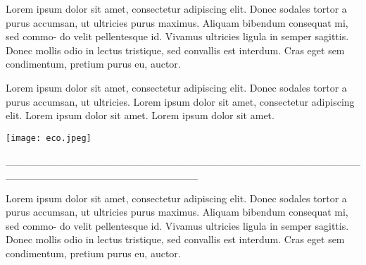 \noindent{}Lorem ipsum dolor sit amet, consectetur adipiscing elit.
Donec sodales tortor a purus accumsan, ut ultricies purus
maximus. Aliquam bibendum consequat mi, sed commo-
do velit pellentesque id. Vivamus ultricies ligula in semper
sagittis. Donec mollis odio in lectus tristique, sed convallis
est interdum. Cras eget sem condimentum, pretium purus
eu, auctor.

\hspace{.5cm}

\hspace*{-.4cm}\begin{minipage}[c]{0.45\linewidth}
\small{
{}}
\end{minipage}
\begin{minipage}[c]{0.50\linewidth}
\small{Lorem ipsum dolor sit amet, consectetur adipiscing elit.
Donec sodales tortor a purus accumsan, ut ultricies. Lorem ipsum dolor sit amet, consectetur adipiscing elit. Lorem ipsum dolor sit amet. Lorem ipsum dolor sit amet.} 
\end{minipage}

\pagebreak

\hspace{.5cm}

\begin{center}
\hspace*{-.5cm}\texttt{[image: eco.jpeg]}
\end{center}

\hspace*{-2cm}\_\_\_\_\_\_\_\_\_\_\_\_\_\_\_\_\_\_\_\_\_\_\_\_\_\_\_\_\_\_\_\_\_\_\_\_\_\_\_\_\_\_\_\_\_\_\_\_\_\_\_\_\_\_\_\_\_\_\_\_\_\_\_\_\_\_\_\_\_\_\_\_\_\_

\medskip

\noindent{}Lorem ipsum dolor sit amet, consectetur adipiscing elit.
Donec sodales tortor a purus accumsan, ut ultricies purus
maximus. Aliquam bibendum consequat mi, sed commo-
do velit pellentesque id. Vivamus ultricies ligula in semper
sagittis. Donec mollis odio in lectus tristique, sed convallis
est interdum. Cras eget sem condimentum, pretium purus
eu, auctor.

